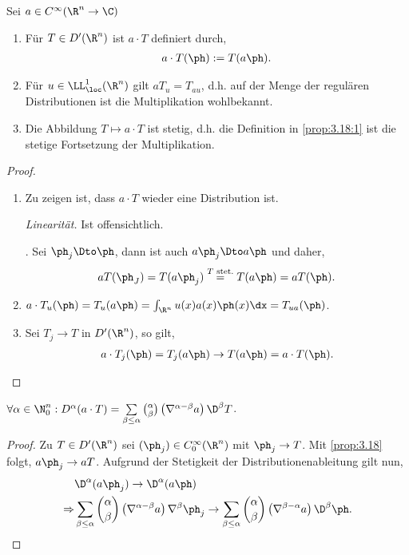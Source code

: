 \begin{prop}
\label{prop:3.18}
Sei $a\in C^\infty(\R^n\to\C)$
\begin{enumerate}[label=\arabic{*}.)]
  \item\label{prop:3.18:1} Für $T\in D'(\R^n)$ ist $a\cdot T$ definiert durch,
\begin{align*}
a\cdot T(\ph) := T(a\ph).
\end{align*}
\item Für $u\in\LL_\loc^1(\R^n)$ gilt $a T_u = T_{au}$, d.h. auf der Menge der
regulären Distributionen ist die Multiplikation wohlbekannt.
\item Die Abbildung $T\mapsto a\cdot T$ ist stetig, d.h. die Definition in
\ref{prop:3.18:1} ist die stetige Fortsetzung der Multiplikation.\fishhere
\end{enumerate}
\end{prop}
\begin{proof}
\begin{enumerate}[label=\arabic{*}.)]
  \item Zu zeigen ist, dass $a\cdot T$ wieder eine 
 Distribution ist.
 
 \textit{Linearität.} Ist offensichtlich.
  
  . Sei $\ph_j\Dto\ph$, dann ist auch $a\ph_j\Dto a\ph$ und
  daher,
\begin{align*}
aT(\ph_J) = T(a\ph_j) \overset{T\text{ stet.}}{=} T(a\ph) = aT(\ph).
\end{align*}
\item $a\cdot T_u(\ph) = T_u(a\ph) = \int_{\R^n} u(x)a(x)\ph(x)\dx =
T_{ua}(\ph)$.
\item Sei $T_j\to T$ in $D'(\R^n)$, so gilt,
\begin{align*}
a\cdot T_j(\ph) = T_j(a\ph) \to T(a\ph) = a\cdot T(\ph).\qedhere
\end{align*}
\end{enumerate}
\end{proof}

\begin{prop}[Leibnitzregel]
\label{prop:3.19}
$\forall \alpha\in\N_0^n : D^\alpha(a\cdot T) = \sum\limits_{\beta\le \alpha}
\binom{\alpha}{\beta} \left(\nabla^{\alpha-\beta} a\right)\D^\beta T$.\fishhere
\end{prop}
\begin{proof}
Zu $T\in D'(\R^n)$ sei $(\ph_j)\in C_0^\infty(\R^n)$ mit $\ph_j\to T$.
Mit \ref{prop:3.18} folgt, $a\ph_j \to aT$. Aufgrund der Stetigkeit der
Distributionenableitung gilt nun,
\begin{align*}
&\D^\alpha (a\ph_j) \to \D^\alpha(a\ph)\\ \Rightarrow &
\sum\limits_{\beta\le\alpha} \binom{\alpha}{\beta} \left(\nabla^{\alpha-\beta} a
\right)\nabla^\beta \ph_j \to \sum\limits_{\beta\le\alpha}
\binom{\alpha}{\beta} \left(\nabla^{\beta-\alpha} a \right)\D^\beta \ph.\qedhere
\end{align*}
\end{proof}

